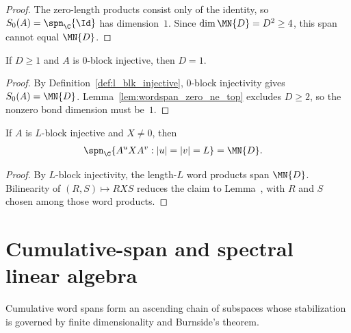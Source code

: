 \begin{proof}\leanok{}
    The zero-length products consist only of the identity, so
    $S_0(A)=\spn_{\C}\{\Id\}$ has dimension~$1$.
    Since $\dim\MN{D}=D^2\ge4$, this span cannot equal $\MN{D}$.
\end{proof}

\begin{lemma}
    \label{cor:blk_inj_zero_dim_one}
    \leanok
    If $D\ge1$ and $A$ is $0$-block injective, then $D=1$.
\end{lemma}

\begin{proof}\leanok{}
    By Definition~\ref{def:l_blk_injective}, $0$-block injectivity gives
    $S_0(A)=\MN{D}$. Lemma~\ref{lem:wordspan_zero_ne_top} excludes
    $D\ge2$, so the nonzero bond dimension must be~$1$.
\end{proof}


\begin{lemma}
    \label{lem:block_injective_two_sided_word_span}
    \leanok
    If $A$ is $L$-block injective and $X\neq0$, then
    \begin{align}
        \spn_{\C}\{A^uXA^v:|u|=|v|=L\}
         & =\MN{D}.
        \notag
    \end{align}
\end{lemma}

\begin{proof}\leanok
    By $L$-block injectivity, the length-$L$ word products span
    $\MN{D}$. Bilinearity of $(R,S)\mapsto RXS$ reduces the claim to
    Lemma~\cite[``Two-sided span from one nonzero matrix'']{QICLean2026Blueprint}, with $R$ and $S$ chosen
    among those word products.
\end{proof}

\section{Cumulative-span and spectral linear algebra}
\label{sec:app_wielandt_cumulative_support}

Cumulative word spans form an ascending chain of subspaces whose stabilization
is governed by finite dimensionality and Burnside's theorem.

